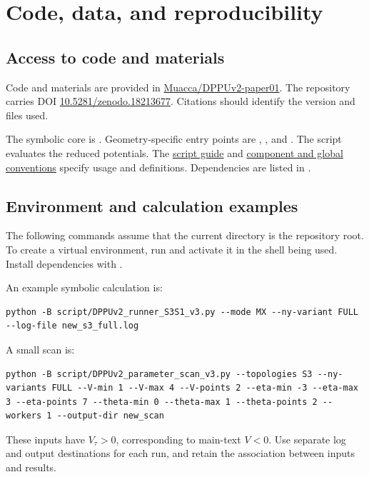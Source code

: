 \section{Code, data, and reproducibility}\label{appF}
\subsection{Access to code and materials}
Code and materials are provided in
\href{https://github.com/Muacca/DPPUv2-paper01}{Muacca/DPPUv2-paper01}.
The repository carries DOI
\href{https://doi.org/10.5281/zenodo.18213677}{10.5281/zenodo.18213677}.
Citations should identify the version and files used.

The symbolic core is .
Geometry-specific entry points are
,
, and
.
The script  evaluates the
reduced potentials.
The \href{https://github.com/Muacca/DPPUv2-paper01/blob/main/script/README_ja.md}{script guide}
and \href{https://github.com/Muacca/DPPUv2-paper01/blob/main/script/docs/CONVENTIONS_ja.md}{component and global conventions}
specify usage and definitions.
Dependencies are listed in .

\subsection{Environment and calculation examples}
The following commands assume that the current directory is the
repository root. To create a virtual environment, run
 and activate it in the shell being used.
Install dependencies with
.

An example symbolic calculation is:
\begin{lstlisting}[language={}]
python -B script/DPPUv2_runner_S3S1_v3.py --mode MX --ny-variant FULL --log-file new_s3_full.log
\end{lstlisting}
A small scan is:
\begin{lstlisting}[language={}]
python -B script/DPPUv2_parameter_scan_v3.py --topologies S3 --ny-variants FULL --V-min 1 --V-max 4 --V-points 2 --eta-min -3 --eta-max 3 --eta-points 7 --theta-min 0 --theta-max 1 --theta-points 2 --workers 1 --output-dir new_scan
\end{lstlisting}
These inputs have $V_\tau>0$, corresponding to main-text $V<0$.
Use separate log and output destinations for each run, and retain
the association between inputs and results.

